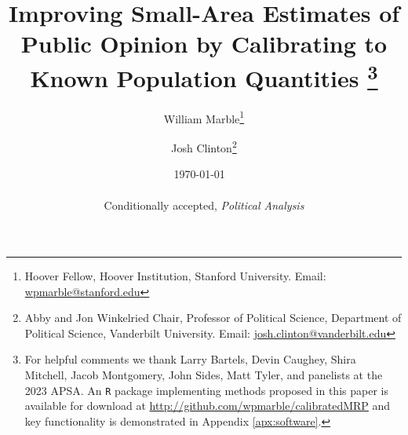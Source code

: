 \documentclass[11pt]{article}
\title{Improving Small-Area Estimates of Public Opinion by Calibrating to Known Population Quantities
\if0\blind
\thanks{%
	For helpful comments we thank Larry Bartels, Devin Caughey, Shira Mitchell, Jacob Montgomery, John Sides, Matt Tyler, and panelists at the 2023 APSA. An \texttt{R} package implementing methods proposed in this paper is available for download at \url{http://github.com/wpmarble/calibratedMRP} and key functionality is demonstrated in Appendix \ref{apx:software}.
	}
\fi
}
\author{
		William Marble\footnote{Hoover Fellow, Hoover Institution, Stanford University. Email: \href{mailto:wpmarble@stanford.edu}{wpmarble@stanford.edu}}
	 \and 
	 	Josh Clinton\footnote{Abby and Jon Winkelried Chair, Professor of Political Science, Department of Political Science, Vanderbilt University. Email: \href{mailto:josh.clinton@vanderbilt.edu}{josh.clinton@vanderbilt.edu}}}
\date{\monthyeardate\today %
~\\~\medskip~\\%
Conditionally accepted, \textit{Political Analysis}
}
\DeclareMathOperator*{\1}{\mathbbm{1}}
\begin{document}
\begin{singlespacing}
\maketitle	
\thispagestyle{empty}
\begin{abstract}

\end{abstract}


\end{singlespacing}
\newpage
\clearpage



{}

\setcounter{page}{1}

\doparttoc %
\faketableofcontents %
\end{document}

